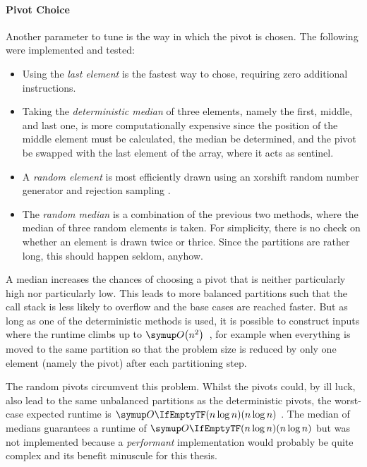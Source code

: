 \paragraph{Pivot Choice}
Another parameter to tune is the way in which the pivot is chosen.
The following were implemented and tested:
\begin{itemize}
	\item
	Using the \emph{last element} is the fastest way to chose, requiring zero additional instructions.

	\item
	Taking the \emph{deterministic median} of three elements, namely the first, middle, and last one, is more computationally expensive since the position of the middle element must be calculated, the median be determined, and the pivot be swapped with the last element of the array, where it acts as sentinel.

	\item
	A \emph{random element} is most efficiently drawn using an xorshift random number generator and rejection sampling \cite{lukas_geis}.

	\item
	The \emph{random median} is a combination of the previous two methods, where the median of three random elements is taken.
	For simplicity, there is no check on whether an element is drawn twice or thrice.
	Since the partitions are rather long, this should happen seldom, anyhow.
\end{itemize}
A median increases the chances of choosing a pivot that is neither particularly high nor particularly low.
This leads to more balanced partitions such that the call stack is less likely to overflow and the base cases are reached faster.
But as long as one of the deterministic methods is used, it is possible to construct inputs where the runtime climbs up to \(\bigoh*{n^2}\)~\cite{erkiö1984worstcase}, for example when everything is moved to the same partition so that the problem size is reduced by only one element (namely the pivot) after each partitioning step.

The random pivots circumvent this problem.
Whilst the pivots could, by ill luck, also lead to the same unbalanced partitions as the deterministic pivots, the worst-case expected runtime is \(\bigoh{n \log n}\) \cite{blum2011probabilistic}.
The median of medians \cite{blum1973median} guarantees a runtime of \(\bigoh{n \log n}\) but was not implemented because a \emph{performant} implementation would probably be quite complex and its benefit minuscule for this thesis.




